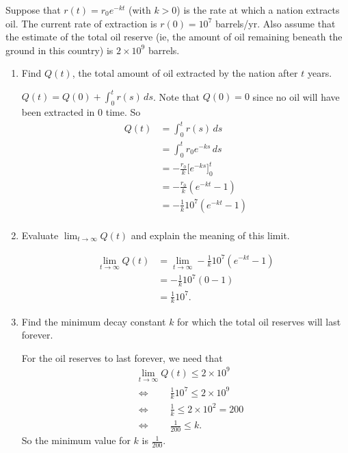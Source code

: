 \documentclass[nooutcomes, handout]{ximera}
\renewcommand{\d}{\,d}
\newcommand{\eval}[1]{\bigg[ #1 \bigg]}
\begin{document}
\begin{problem}
Suppose that $r(t) = r_0 e^{-kt}$ (with $k>0$) is the rate at which a nation extracts oil.  
The current rate of extraction is $r(0) = 10^7$ barrels/yr.  
Also assume that the estimate of the total oil reserve (ie, the amount of oil remaining beneath the ground in this country) is $2 \times 10^9$ barrels.

	\begin{enumerate}
	
	\item  Find $Q(t)$, the total amount of oil extracted by the nation after $t$ years.
		\begin{freeResponse}
		$Q(t) = Q(0) + \int_0^t r(s) \d s$.  Note that $Q(0)=0$ since no oil will have been extracted in $0$ time.  So
			\begin{align*}
			Q(t) &= \int_0^t r(s) \d s  \\
			&= \int_0^t r_0 e^{-ks} \d s  \\
			&= - \frac{r_0}{k} \eval{e^{-ks}}_0^t  \\
			&= - \frac{r_0}{k} \left( e^{-kt} - 1 \right)  \\
			&= - \frac{1}{k} 10^7 \left(e^{-kt}-1 \right)  \\
			\end{align*}
		\end{freeResponse}
		
		
		
	\item  Evaluate $\lim_{t \to \infty} Q(t)$ and explain the meaning of this limit.
		\begin{freeResponse}
			\begin{align*}
			\lim_{t \to \infty} Q(t) &= \lim_{t \to \infty} - \frac{1}{k} 10^7 \left(e^{-kt}-1 \right)  \\
			&= - \frac{1}{k} 10^7 (0-1)  \\
			&= \frac{1}{k} 10^7.
			\end{align*}
		\end{freeResponse}
		
		
		
	\item  Find the minimum decay constant $k$ for which the total oil reserves will last forever.
		\begin{freeResponse}
		For the oil reserves to last forever, we need that
			\begin{align*}
			&\lim_{t \to \infty} Q(t) \leq 2 \times 10^9  \\
			 &\Longleftrightarrow \qquad \frac{1}{k} 10^7 \leq 2 \times 10^9  \\
			 &\Longleftrightarrow \qquad \frac{1}{k} \leq 2 \times 10^2 = 200  \\
			 &\Longleftrightarrow \qquad \frac{1}{200} \leq k.
			\end{align*}
		So the minimum value for $k$ is $\frac{1}{200}$.  
		\end{freeResponse}
		

\end{enumerate}
\end{problem}
\end{document}
